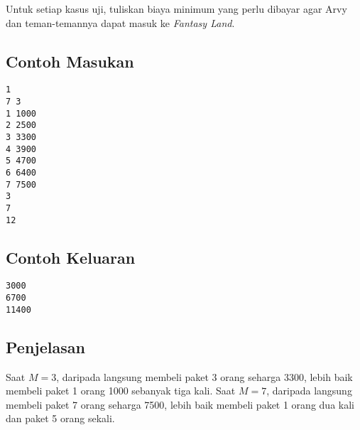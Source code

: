 \documentclass{article}
\begin{document}
Untuk setiap kasus uji, tuliskan biaya minimum yang perlu dibayar agar Arvy dan teman-temannya dapat masuk ke \textit{Fantasy Land}.

\begin{multicols}{2}
\subsection*{Contoh Masukan}
\begin{lstlisting}
1
7 3
1 1000
2 2500
3 3300
4 3900
5 4700
6 6400
7 7500
3
7
12
\end{lstlisting}
\columnbreak
\subsection*{Contoh Keluaran}
\begin{lstlisting}
3000
6700
11400
\end{lstlisting}
\vfill
\null
\end{multicols}


\subsection*{Penjelasan}

Saat $M=3$, daripada langsung membeli paket 3 orang seharga 3300, lebih baik membeli paket 1 orang 1000 sebanyak tiga kali.
Saat $M=7$, daripada langsung membeli paket 7 orang seharga 7500, lebih baik membeli paket 1 orang dua kali dan paket 5 orang sekali.

\pagebreak
\end{document}
